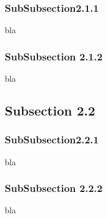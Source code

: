 \documentclass{beamer}
\begin{document}
\subsubsection{SubSubsection2.1.1}
\begin{frame}
bla
\end{frame}
\subsubsection{SubSubsection 2.1.2}
\begin{frame}
bla
\end{frame}

\subsection{Subsection 2.2}
\subsubsection{SubSubsection2.2.1}
\begin{frame}
bla
\end{frame}
\subsubsection{SubSubsection 2.2.2}
\begin{frame}
bla
\end{frame}
\end{document}
